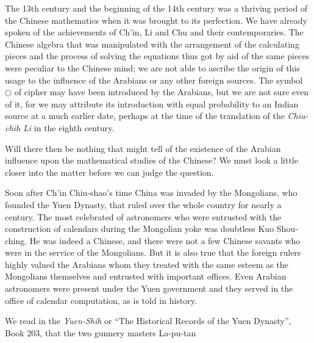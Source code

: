 \documentclass[11pt]{article}
\newcommand{\scanfooter}{}
\begin{document}
The 13th century and the beginning of the 14th century was a thriving period of the Chinese mathematics when it was brought to its perfection. We have already spoken of the achievements of Ch'in, Li and Chu and their contemporaries. The Chinese algebra that was manipulated with the arrangement of the calculating pieces and the process of solving the equations thus got by aid of the same pieces were peculiar to the Chinese mind; we are not able to ascribe the origin of this usage to the influence of the Arabians or any other foreign sources. The symbol $\bigcirc$ of cipher may have been introduced by the Arabians, but we are not sure even of it, for we may attribute its introduction with equal probability to an Indian source at a much earlier date, perhaps at the time of the translation of the \emph{Chiu-chih Li} in the eighth century.

Will there then be nothing that might tell of the existence of the Arabian influence upon the mathematical studies of the Chinese? We must look a little closer into the matter before we can judge the question.

Soon after Ch'in Chiu-shao's time China was invaded by the Mongolians, who founded the Yuen Dynasty, that ruled over the whole country for nearly a century. The most celebrated of astronomers who were entrusted with the construction of calendars during the Mongolian yoke was doubtless Kuo Shou-ching. He was indeed a Chinese, and there were not a few Chinese savants who were in the service of the Mongolians. But it is also true that the foreign rulers highly valued the Arabians whom they treated with the same esteem as the Mongolians themselves and entrusted with important offices. Even Arabian astronomers were present under the Yuen government and they served in the office of calendar computation, as is told in history.

We read in the \emph{Yuen-Shih} or ``The Historical Records of the Yuen Dynasty'', Book 203, that the two gunnery masters La-pu-tan
\scanfooter
\end{document}
